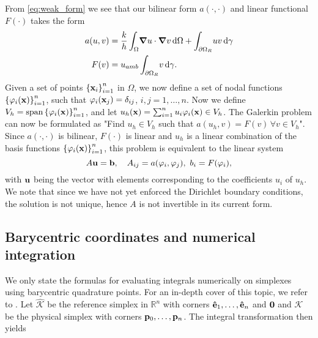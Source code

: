From \eqref{eq:weak_form} we see that our bilinear form $a(\cdot,\cdot)$ and linear functional $F(\cdot)$ takes the form
\begin{align}
	a(u,v) &= \frac{k}{h}\int_\Omega \! \grad{u}\cdot\grad{v} \, \mathrm{d}\Omega + \int_{\partial\Omega_R} \! uv\, \mathrm{d}\gamma \\
	F(v) &= u_{amb}\int_{\partial\Omega_R} \! v \, \mathrm{d}\gamma.
	\label{eq:bilin_form}
\end{align}
Given a set of points $\left\{\vb{x}_i\right\}_{i=1}^n$ in $\Omega$, we now define a set of nodal functions $\left\{\varphi_i(\vb{x})\right\}_{i=1}^n$, such that $\varphi_i(\vb{x}_j) = \delta_{ij}$, $i,j = 1,\dots,n$. Now we define $V_h = \operatorname{span}\left\{\varphi_i(\vb{x})\right\}_{i=1}^n$, and let $u_h(\vb{x}) = \sum_{i=1}^{n} u_i \varphi_i(\vb{x}) \in V_h$. The Galerkin problem can now be formulated as "Find $u_h \in V_h$ such that $a(u_h,v) = F(v)\, \forall v \in V_h$". Since $a(\cdot,\cdot)$ is bilinear, $F(\cdot)$ is linear and $u_h$  is a linear combination of the basis functions $\left\{\varphi_i(\vb{x})\right\}_{i=1}^n$, this problem is equivalent to the linear system
\begin{equation}
	A\vb{u} = \vb{b}, \quad A_{ij} = a(\varphi_i,\varphi_j), \,\, b_i = F(\varphi_i)
	\label{eq:lin_sys},
\end{equation}
with $\vb{u}$ being the vector with elements corresponding to the coefficients $u_i$ of $u_h$. We note that since we have not yet enforced the Dirichlet boundary conditions, the solution is not unique, hence $A$ is not invertible in its current form.

\subsection{Barycentric coordinates and numerical integration}
We only state the formulas for evaluating integrals numerically on simplexes using barycentric quadrature points. For an in-depth cover of this topic, we refer to \cite{quarteroni}. Let $\mathcal{\hat{K}}$ be the reference simplex in $\mathbb{R}^n$ with corners $\vb{\hat{e}}_1,\dots,\vb{\hat{e}}_n$ and $\vb{0}$ and  $\mathcal{K}$ be the physical simplex with corners $\vb{p}_0,\dots,\vb{p}_n$. The integral transformation then yields 

